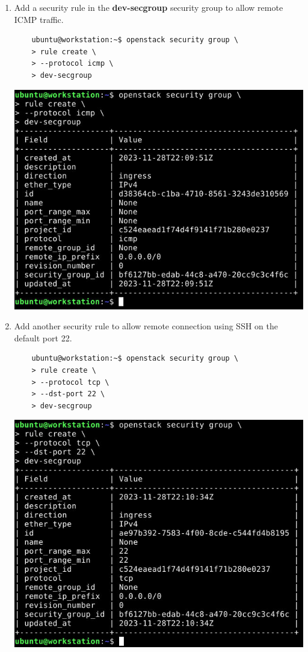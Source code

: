 \documentclass[letterpaper, 12pt]{article}
\begin{document}
\begin{enumerate}
    \item Add a security rule in the \textbf{dev-secgroup} security group to allow remote ICMP traffic.
    \begin{lstlisting}
    ubuntu@workstation:~$ openstack security group \
    > rule create \
    > --protocol icmp \
    > dev-secgroup
    \end{lstlisting}

    \begin{center}
        \includegraphics[width=\linewidth]{images/part1/step16.png}
    \end{center}

    \item Add another security rule to allow remote connection using SSH on the default port 22.
    \begin{lstlisting}
    ubuntu@workstation:~$ openstack security group \
    > rule create \
    > --protocol tcp \
    > --dst-port 22 \
    > dev-secgroup
    \end{lstlisting}

    \begin{center}
        \includegraphics[width=\linewidth]{images/part1/step17.png}
    \end{center}


\end{enumerate}
\end{document}
